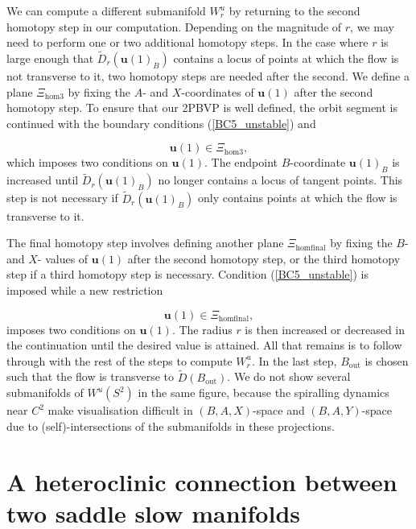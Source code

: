 \documentclass{ws-ijbc}
\begin{document}
We can compute a different submanifold $W^u_r$ by returning to the second homotopy step in our computation.   Depending on the magnitude of $r$, we may need to perform one or two additional homotopy steps.  In the case where $r$ is large enough that $\widetilde{D}_r(\mathbf{u}(1)_B)$ contains a locus of points at which the flow is not transverse to it, two homotopy steps are needed after the second.  We define a plane $\Xi_{\mathrm{hom3}}$ by fixing the $A$- and $X$-coordinates of $\mathbf{u}(1)$ after the second homotopy step.  To ensure that our 2PBVP is well defined, the orbit segment is continued with the boundary conditions (\ref{BC5_unstable}) and

\begin{equation}
\mathbf{u}(1) \in \Xi_{\mathrm{hom3}},
\label{BC8_unstable}
\end{equation}
\noindent
which imposes two conditions on $\mathbf{u}(1)$.  The endpoint $B$-coordinate $\mathbf{u}(1)_B$ is increased until $\widetilde{D}_r(\mathbf{u}(1)_B)$ no longer contains a locus of tangent points.  This step is not necessary if $\tilde{D}_r(\mathbf{u}(1)_B)$ only contains points at which the flow is transverse to it.

The final homotopy step involves defining another plane $\Xi_{\mathrm{homfinal}}$ by fixing the $B$- and $X$- values of $\mathbf{u}(1)$ after the second homotopy step, or the third homotopy step if a third homotopy step is necessary.  Condition (\ref{BC5_unstable}) is imposed while a new restriction

\begin{equation}
\mathbf{u}(1) \in \Xi_{\mathrm{homfinal}},
\label{BC9_unstable}
\end{equation}
\noindent
imposes two conditions on $\mathbf{u}(1)$.  The radius $r$ is then increased or decreased in the continuation until the desired value is attained.  All that remains is to follow through with the rest of the steps to compute $W^u_r$.  In the last step, $B_{\text{out}}$ is chosen such that the flow is transverse to $\widetilde{D}(B_{\text{out}})$.  We do not show several submanifolds of $W^u(S^2)$ in the same figure, because the spiralling dynamics near $C^2$ make visualisation difficult in $(B,A,X)$-space and $(B,A,Y)$-space due to (self)-intersections of the submanifolds in these projections.


\section{A heteroclinic connection between two saddle slow manifolds}
\end{document}
